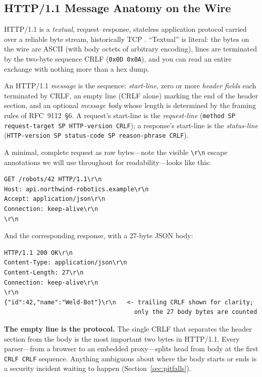 \subsection{HTTP/1.1 Message Anatomy on the Wire}

HTTP/1.1 is a \emph{textual}, request--response, stateless application protocol carried over a reliable byte stream, historically TCP \cite{rfc9112}. ``Textual'' is literal: the bytes on the wire are ASCII (with body octets of arbitrary encoding), lines are terminated by the two-byte sequence CRLF (\texttt{0x0D 0x0A}), and you can read an entire exchange with nothing more than a hex dump.

\begin{definition}
An HTTP/1.1 \emph{message} is the sequence: \emph{start-line}, zero or more \emph{header fields} each terminated by CRLF, an empty line (CRLF alone) marking the end of the header section, and an optional \emph{message body} whose length is determined by the framing rules of RFC~9112~\S6. A request's start-line is the \emph{request-line} (\texttt{method SP request-target SP HTTP-version CRLF}); a response's start-line is the \emph{status-line} (\texttt{HTTP-version SP status-code SP reason-phrase CRLF}).
\end{definition}

A minimal, complete request as raw bytes---note the visible \texttt{\textbackslash r\textbackslash n} escape annotations we will use throughout for readability---looks like this:

\begin{verbatim}
GET /robots/42 HTTP/1.1\r\n
Host: api.northwind-robotics.example\r\n
Accept: application/json\r\n
Connection: keep-alive\r\n
\r\n
\end{verbatim}

And the corresponding response, with a 27-byte JSON body:

\begin{verbatim}
HTTP/1.1 200 OK\r\n
Content-Type: application/json\r\n
Content-Length: 27\r\n
Connection: keep-alive\r\n
\r\n
{"id":42,"name":"Weld-Bot"}\r\n   <- trailing CRLF shown for clarity;
                                    only the 27 body bytes are counted
\end{verbatim}

\begin{keyconceptbox}
\textbf{The empty line is the protocol.} The single CRLF that separates the header section from the body is the most important two bytes in HTTP/1.1. Every parser---from a browser to an embedded proxy---splits head from body at the first \texttt{CRLF CRLF} sequence. Anything ambiguous about where the body starts or ends is a security incident waiting to happen (Section~\ref{sec:pitfalls}).
\end{keyconceptbox}

